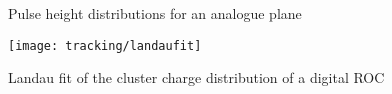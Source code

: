 \begin{figure}[ht]
	\centering
	\hfill
	\caption{Pulse height distributions for an analogue plane}
	\label{pphmap2}
\end{figure}\no
\begin{figure}[ht]
	\centering
	\texttt{[image: tracking/landaufit]}
	\caption{Landau fit of the cluster charge distribution of a digital \ac{ROC}}
	\label{plandaufit}
\end{figure}\no
